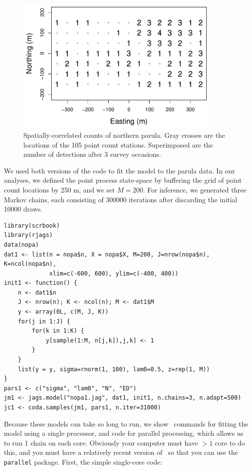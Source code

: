 \begin{figure}
  \centering
  \includegraphics[width=0.9\textwidth]{Ch18-Unmarked/figs/nopaCounts}
  \caption{Spatially-correlated counts of northern parula. Gray
    crosses are the locations of the 105 point count
    stations. Superimposed are the number of detections after 3 survey occasions.}
  \label{fig:nopaDat}
\end{figure}


We used both versions of the code to fit the
model to the parula data. In our analyses, we defined the point process
state-space by buffering the grid of point count locations by 250 m,
and we set $M=200$. For inference, we generated three Markov chains,
each consisting of 300000 iterations after discarding the initial 10000
draws. %
\begin{small}
\begin{verbatim}
library(scrbook)
library(rjags)
data(nopa)
dat1 <- list(n = nopa$n, X = nopa$X, M=200, J=nrow(nopa$n), K=ncol(nopa$n),
             xlim=c(-600, 600), ylim=c(-400, 400))
init1 <- function() {
    n <- dat1$n
    J <- nrow(n); K <- ncol(n); M <- dat1$M
    y <- array(0L, c(M, J, K))
    for(j in 1:J) {
        for(k in 1:K) {
            y[sample(1:M, n[j,k]),j,k] <- 1
        }
    }
    list(y = y, sigma=rnorm(1, 100), lam0=0.5, z=rep(1, M))
}
pars1 <- c("sigma", "lam0", "N", "ED")
jm1 <- jags.model("nopa1.jag", dat1, init1, n.chains=3, n.adapt=500)
jc1 <- coda.samples(jm1, pars1, n.iter=31000)
\end{verbatim}
\end{small}




Because these models can take so long to run, we show \R~commands for
fitting the model using a single processor, and code for parallel
processing, which allows us to run 1 chain on each core. Obviously
your computer must have $>1$ core to do this, and you must have a
relatively recent version of \R~so that you can use the {\tt parallel}
package. First, the simple single-core code:




